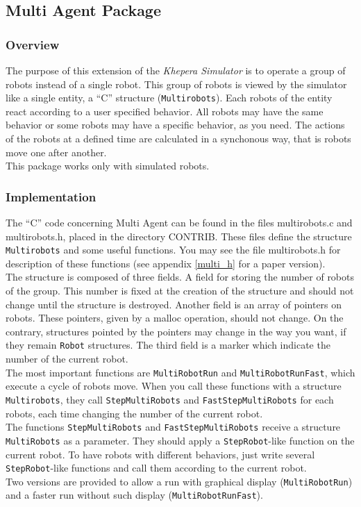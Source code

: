 \documentclass[a4paper,twoside]{article}
\begin{document}
\subsection{Multi Agent Package}
\subsubsection{Overview}
The purpose of this extension of the {\it Khepera Simulator} is to operate a group of robots instead of a single robot. This group of robots is viewed by the simulator like a single entity, a ``C'' structure ({\tt Multirobots}). Each robots of the entity react according to a user specified behavior. All robots may have the same behavior or some robots may have a specific behavior, as you need. The actions of the robots at a defined time are calculated in a synchonous way, that is robots move one after another.\\
This package works only with simulated robots.
\subsubsection{Implementation}
The ``C'' code concerning Multi Agent can be found in the files multirobots.c and multirobots.h, placed in the directory CONTRIB.
These files define the structure {\tt Multirobots} and some useful functions. You may see the file multirobots.h for description of these functions (see appendix \ref{multi_h} for a paper version). \\
The structure is composed of three fields. A field for storing the number of robots of the group. This number is fixed at the creation of the structure and should not change until the structure is destroyed. Another field is an array of pointers on robots. These pointers, given by a malloc operation, should not change. On the contrary, structures pointed by the pointers may change in the way you want, if they remain {\tt Robot} structures. The third field is a marker which indicate the number of the current robot.\\
The most important functions are {\tt MultiRobotRun} and {\tt MultiRobotRunFast}, which execute a cycle of robots move. When you call these functions with a structure {\tt Multirobots}, they  call {\tt StepMultiRobots} and  {\tt FastStepMultiRobots} for each robots, each time changing the number of the current robot.\\
The functions {\tt StepMultiRobots} and  {\tt FastStepMultiRobots} receive a
structure {\tt MultiRobots} as a parameter. They should apply a
{\tt StepRobot}-like function on the current robot. To have robots with
different behaviors, just write several {\tt StepRobot}-like functions and
call them according to the current robot.\\
Two versions are provided to allow a run with graphical display ({\tt MultiRobotRun}) and a faster run without such display ({\tt MultiRobotRunFast}).
\end{document}
